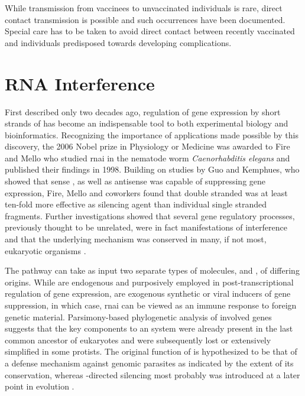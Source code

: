While transmission from vaccinees to unvaccinated individuals is rare, direct contact transmission is possible and such occurrences have been documented. Special care has to be taken to avoid direct contact between recently vaccinated and individuals predisposed towards developing complications.

\section{RNA Interference}
First described only two decades ago, regulation of gene expression by short strands of  has become an indispensable tool to both experimental biology and bioinformatics. Recognizing the importance of applications made possible by this discovery, the 2006 Nobel prize in Physiology or Medicine was awarded to Fire and Mello who studied \acrlong{rnai} in the nematode worm \textit{Caenorhabditis elegans} and published their findings in 1998. Building on studies by Guo and Kemphues, who showed that sense , as well as antisense  was capable of suppressing gene expression, Fire, Mello and coworkers found that double stranded  was at least ten-fold more effective as silencing agent than individual single stranded fragments. Further investigations showed that several gene regulatory processes, previously thought to be unrelated, were in fact manifestations of  interference and that the underlying mechanism was conserved in many, if not most, eukaryotic organisms \citep{Hannon2002}.

The  pathway can take as input two separate types of  molecules,  and , of differing origins. While  are endogenous and purposively employed in post-transcriptional regulation of gene expression,  are exogenous synthetic or viral inducers of gene suppression, in which case, \acrlong{rnai} can be viewed as an immune response to foreign genetic material. Parsimony-based phylogenetic analysis of involved genes suggests that the key components to an  system were already present in the last common ancestor of eukaryotes and were subsequently lost or extensively simplified in some protists. The original function of  is hypothesized to be that of a defense mechanism against genomic parasites as indicated by the extent of its conservation, whereas -directed silencing most probably was introduced at a later point in evolution \citep{Cerutti2006}.


